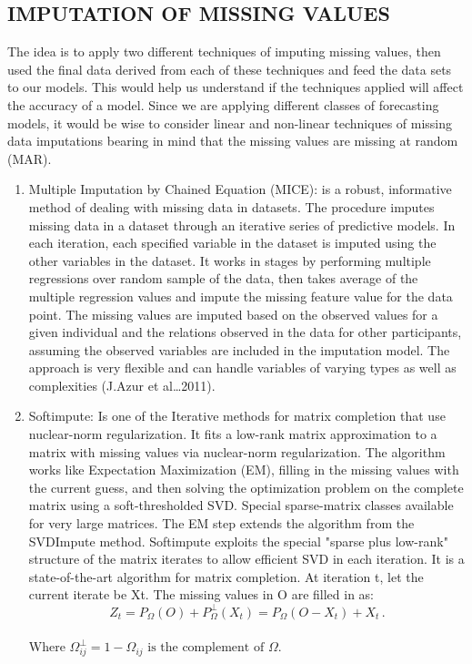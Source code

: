 \documentclass[12pt,italian, twoside]{report}
\begin{document}
\subsection{IMPUTATION OF MISSING VALUES}
The idea is to apply two different techniques of imputing missing values, then used the final data derived from each of these techniques and feed the data sets to our models. This would help us understand if the techniques applied will affect the accuracy of a model. Since we are applying different classes of forecasting models, it would be wise to consider linear and non-linear techniques of missing data imputations bearing in mind that the missing values are missing at random (MAR).
\begin{enumerate}
	\item Multiple Imputation by Chained Equation (MICE): is a robust, informative method of dealing with missing data in datasets. The procedure imputes missing data in a dataset through an iterative series of predictive models. In each iteration, each specified variable in the dataset is imputed using the other variables in the dataset. It works in stages by performing multiple regressions over random sample of the data, then takes average of the multiple regression values and impute the missing feature value for the data point. The missing values are imputed based on the observed values for a given individual and the relations observed in the data for other participants, assuming the observed variables are included in the imputation model. The approach is very flexible and can handle variables of varying types as well as complexities (J.Azur et al…2011).
	\item Softimpute: Is one of the Iterative methods for matrix completion that use nuclear-norm regularization. It fits a low-rank matrix approximation to a matrix with missing values via nuclear-norm regularization. The algorithm works like Expectation Maximization (EM), filling in the missing values with the current guess, and then solving the optimization problem on the complete matrix using a soft-thresholded SVD. Special sparse-matrix classes available for very large matrices. The EM step extends the algorithm from the SVDImpute method. Softimpute exploits the special "sparse plus low-rank" structure of the matrix iterates to allow efficient SVD in each iteration. It is a state-of-the-art algorithm for matrix completion. At iteration t, let the current iterate be Xt. The missing values in O are filled in as:
\begin{equation}
 Z_t= P_\Omega (O)+ P_\Omega^\bot  (X_t ) = P_\Omega (O-X_t ) + X_t  \, .
	\label{eq:softimpute}
\end{equation}\\
Where $\Omega_{ij}^\bot =1-\Omega_{ij} \textrm{ is the complement of } \Omega$.
	
\end{enumerate}
\end{document}
